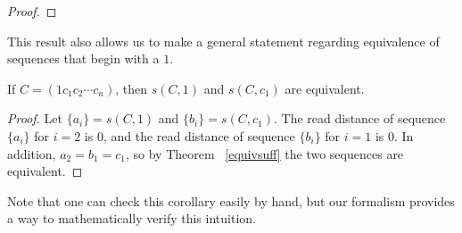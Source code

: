 \documentclass[runningheads,a4paper]{llncs}
\begin{document}
\begin{proof}




\end{proof}

This result also allows us to make a general statement regarding equivalence of sequences that begin with a $1$.
\begin{corollary} If $C = (1 c_1 c_2 \cdots c_n)$, then $s(C, 1)$ and $s(C, c_1)$ are equivalent.
\end{corollary}
\begin{proof}
Let $\{a_i\} = s(C, 1)$ and $\{b_i\} = s(C, c_1)$. The read distance of sequence $\{a_i\}$ for $i=2$ is 0, and the read distance of sequence $\{b_i\}$ for $i = 1$ is 0. In addition, $a_2 = b_1 = c_1$, so by Theorem ~\ref{equivsuff} the two sequences are equivalent.
\end{proof}
Note that one can check this corollary easily by hand, but our formalism provides a way to mathematically verify this intuition.
\end{document}
